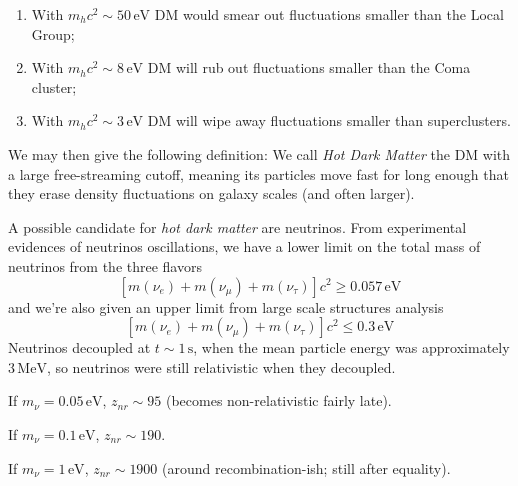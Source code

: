 \begin{enumerate}
    \item With $m_{h}c^{2}\sim 50\,\text{eV}$ DM would smear out fluctuations smaller than the Local Group;
    \item With $m_{h}c^{2}\sim 8\,\text{eV}$ DM will rub out fluctuations smaller than the Coma cluster;
    \item With $m_{h}c^{2}\sim 3\,\text{eV}$ DM will wipe away fluctuations smaller than superclusters.
\end{enumerate}
We may then give the following definition: We call \emph{Hot Dark Matter} the DM with a large free-streaming cutoff, meaning its particles move fast for long enough that they erase density fluctuations on galaxy scales (and often larger).

\begin{tcolorbox}[enhanced,attach boxed title to top center={yshift=-3mm,yshifttext=-1mm},
  colback=blue!5!white,colframe=blue!75!black,colbacktitle=blue!80!black,
  title=Hot DM: Neutrinos,
  boxed title style={size=small,colframe=blue!50!black}]
  A possible candidate for \emph{hot dark matter} are neutrinos. From experimental evidences of neutrinos oscillations, we have a lower limit on the total mass of neutrinos from the three flavors
  $$ [m(\nu_{e})+m(\nu_{\mu})+m(\nu_{\tau})]c^{2} \geq 0.057\,\text{eV}$$
  and we're also given an upper limit from large scale structures analysis
  $$ [m(\nu_{e})+m(\nu_{\mu})+m(\nu_{\tau})]c^{2} \leq 0.3\,\text{eV}$$
  Neutrinos decoupled at $t\sim 1\,\text{s}$, when the mean particle energy was approximately $3\,\text{MeV}$, so neutrinos were still relativistic when they decoupled.
  \par If $m_{\nu}=0.05\,\text{eV}$, $z_{nr} \sim 95$ (becomes non-relativistic fairly late).
  \par If $m_{\nu}=0.1\,\text{eV}$, $z_{nr} \sim 190$.
  \par If $m_{\nu}=1\,\text{eV}$, $z_{nr} \sim 1900$ (around recombination-ish; still after equality).
\end{tcolorbox}


